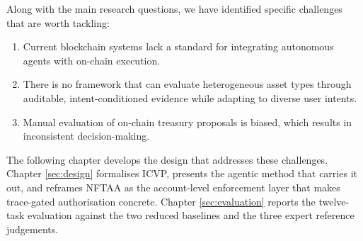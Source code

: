 Along with the main research questions, we have identified specific challenges that are worth tackling:

\begin{enumerate}
  \item Current blockchain systems lack a standard for integrating autonomous agents with on-chain execution.
  \item There is no framework that can evaluate heterogeneous asset types through auditable, intent-conditioned evidence while adapting to diverse user intents.
  \item Manual evaluation of on-chain treasury proposals is biased, which results in inconsistent decision-making.
\end{enumerate}

The following chapter develops the design that addresses these challenges. Chapter \ref{sec:design} formalises ICVP, presents the agentic method that carries it out, and reframes NFTAA as the account-level enforcement layer that makes trace-gated authorisation concrete. Chapter \ref{sec:evaluation} reports the twelve-task evaluation against the two reduced baselines and the three expert reference judgements.
